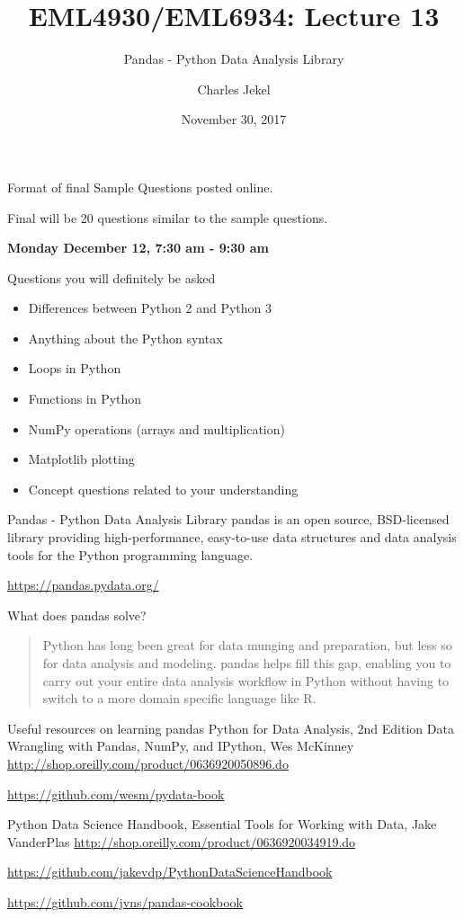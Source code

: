 \documentclass[10pt]{beamer}
\title{EML4930/EML6934: Lecture 13}
\subtitle{Pandas - Python Data Analysis Library}
\date{November 30, 2017}
\author{Charles Jekel}
\begin{document}
\maketitle

\begin{frame}{Format of final}
Sample Questions posted online.

Final will be 20 questions similar to the sample questions. 

\textbf{Monday December 12, 7:30 am - 9:30 am}
\end{frame}

\begin{frame}{Questions you will definitely be asked}
\begin{itemize}
\item Differences between Python 2 and Python 3
\item Anything about the Python syntax
\item Loops in Python
\item Functions in Python
\item NumPy operations (arrays and multiplication) 
\item Matplotlib plotting
\item Concept questions related to your understanding
\end{itemize}
\end{frame}

\begin{frame}{Pandas - Python Data Analysis Library}
pandas is an open source, BSD-licensed library providing high-performance, easy-to-use data structures and data analysis tools for the Python programming language.

\url{https://pandas.pydata.org/}

What does pandas solve?
  \begin{quote}
    Python has long been great for data munging and preparation, but less so for data analysis and modeling. pandas helps fill this gap, enabling you to carry out your entire data analysis workflow in Python without having to switch to a more domain specific language like R.
\end{quote}

\end{frame}

\begin{frame}{Useful resources on learning pandas}
Python for Data Analysis, 2nd Edition Data Wrangling with Pandas, NumPy, and IPython, Wes McKinney \url{http://shop.oreilly.com/product/0636920050896.do}

\url{https://github.com/wesm/pydata-book}

Python Data Science Handbook, Essential Tools for Working with Data, Jake VanderPlas \url{http://shop.oreilly.com/product/0636920034919.do}

\url{https://github.com/jakevdp/PythonDataScienceHandbook}

\url{https://github.com/jvns/pandas-cookbook}
\end{frame}
\end{document}
